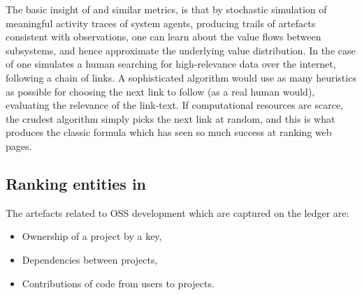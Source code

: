 The basic insight of \pagerank{} and similar metrics, is that by
stochastic simulation of meaningful activity traces of system agents,
producing trails of artefacts consistent with observations, one can
learn about the value flows between subsystems, and hence approximate
the underlying value distribution. In the case of \pagerank{} one
simulates a human searching for high-relevance data over the internet,
following a chain of links. A sophisticated algorithm would use as
many heuristics as possible for choosing the next link to follow (as a
real human would), \eg{} evaluating the relevance of the link-text. If
computational resources are scarce, the crudest algorithm simply picks
the next link at random, and this is what produces the classic
\pagerank{} formula which has seen so much success at ranking web
pages.

\subsection{Ranking entities in \oscoin{}}

The artefacts related to OSS development which are captured on the \oscoin{}
ledger are:
\begin{itemize}
  \item Ownership of a project by a key,
  \item Dependencies between projects,
  \item Contributions of code from users to projects.
\end{itemize}

\begin{center}
\end{center}

